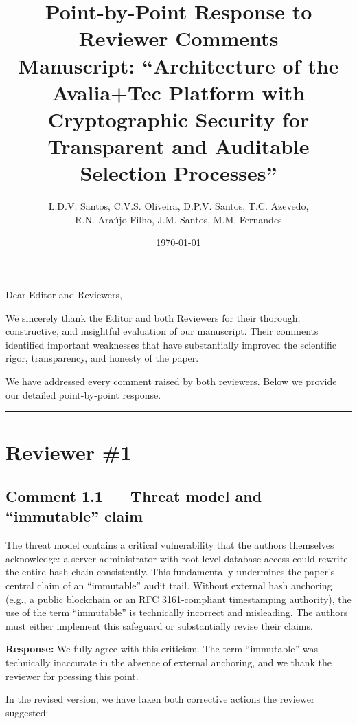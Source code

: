 \documentclass[11pt,a4paper]{article}
\title{Point-by-Point Response to Reviewer Comments\\[0.3em]
\large Manuscript: ``Architecture of the Avalia+Tec Platform with Cryptographic Security for\\
Transparent and Auditable Selection Processes''}
\author{L.D.V. Santos, C.V.S. Oliveira, D.P.V. Santos, T.C. Azevedo,\\
R.N. Araújo Filho, J.M. Santos, M.M. Fernandes}
\date{\today}
\newcommand{\response}[1]{\par\noindent\textcolor{responsecolor}{\textbf{Response:}} #1}
\begin{document}
\maketitle

\noindent Dear Editor and Reviewers,

\medskip
\noindent We sincerely thank the Editor and both Reviewers for their thorough, constructive, and insightful evaluation of our manuscript. Their comments identified important weaknesses that have substantially improved the scientific rigor, transparency, and honesty of the paper.

We have addressed every comment raised by both reviewers. Below we provide our detailed point-by-point response.

\bigskip
\hrule
\bigskip

\section*{Reviewer \#1}

\subsection*{Comment 1.1 --- Threat model and ``immutable'' claim}

\begin{reviewerbox}
The threat model contains a critical vulnerability that the authors themselves acknowledge: a server administrator with root-level database access could rewrite the entire hash chain consistently. This fundamentally undermines the paper's central claim of an ``immutable'' audit trail. Without external hash anchoring (e.g., a public blockchain or an RFC 3161-compliant timestamping authority), the use of the term ``immutable'' is technically incorrect and misleading. The authors must either implement this safeguard or substantially revise their claims.
\end{reviewerbox}

\response{We fully agree with this criticism. The term ``immutable'' was technically inaccurate in the absence of external anchoring, and we thank the reviewer for pressing this point.}

In the revised version, we have taken both corrective actions the reviewer suggested:
\end{document}
